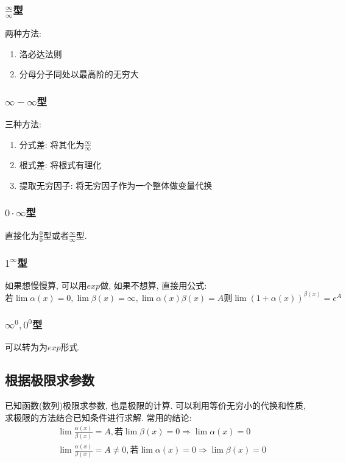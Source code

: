 \subsubsection{$ \frac{\infty}{\infty} $型}
两种方法:
\begin{enumerate}
\item 洛必达法则
\item 分母分子同处以最高阶的无穷大
\end{enumerate}
\subsubsection{$ \infty-\infty $型}
三种方法:
\begin{enumerate}
\item 分式差: 将其化为$ \frac{\infty}{\infty} $
\item 根式差: 将根式有理化
\item 提取无穷因子: 将无穷因子作为一个整体做变量代换
\end{enumerate}
\subsubsection{$ 0\cdot \infty $型}
直接化为$ \frac{0}{0} $型或者$ \frac{\infty}{\infty} $型.
\subsubsection{$ 1^{\infty} $型}
如果想慢慢算, 可以用$ exp $做, 如果不想算, 直接用公式:
\begin{equation*}
\text{若}\lim\limits \alpha(x)=0, \lim\limits \beta(x)=\infty, \lim\limits \alpha(x)\beta(x)=A \text{则}\lim\limits (1+\alpha(x))^{\beta(x)}=e^{A}
\end{equation*}
\subsubsection{$ \infty^{0}, 0^{0} $型}
可以转为为$ exp $形式.
\subsection{根据极限求参数}
已知函数(数列)极限求参数, 也是极限的计算. 可以利用等价无穷小的代换和性质, 求极限的方法结合已知条件进行求解. 常用的结论:
\begin{equation*}
\begin{aligned}
& \lim\limits \frac{\alpha(x)}{\beta(x)}=A, 若 \lim\limits \beta(x)=0\Rightarrow \lim\limits \alpha(x)=0 \\
& \lim\limits \frac{\alpha(x)}{\beta(x)}=A\neq 0, 若 \lim\limits \alpha(x)=0\Rightarrow \lim\limits \beta(x)=0
\end{aligned}
\end{equation*}
